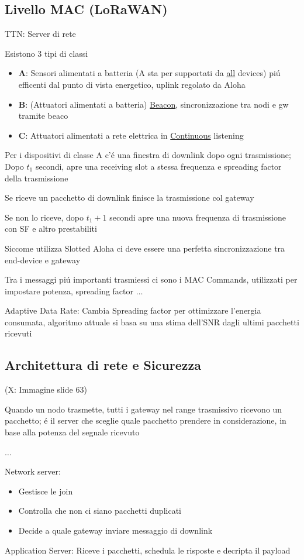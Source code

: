 \documentclass{article}
\begin{document}
\subsection{Livello MAC (LoRaWAN)}
TTN: Server di rete

Esistono 3 tipi di classi
\begin{itemize}
    \item \textbf{A}: Sensori alimentati a batteria (A sta per supportati da \underline{all} devices) pi\'u efficenti dal punto di vista energetico, uplink regolato da Aloha
    \item \textbf{B}: (Attuatori alimentati a batteria) \underline{Beacon}, sincronizzazione tra nodi e gw tramite beaco
    \item \textbf{C}: Attuatori alimentati a rete elettrica in \underline{Continuous} listening
\end{itemize}

Per i dispositivi di classe A c'\'e una finestra di downlink dopo ogni trasmissione; Dopo $t_1$ secondi, apre una receiving slot a stessa frequenza e spreading factor della trasmissione

Se riceve un pacchetto di downlink finisce la trasmissione col gateway

Se non lo riceve, dopo $t_1 + 1$ secondi apre una nuova frequenza di trasmissione con SF e altro prestabiliti

Siccome utilizza Slotted Aloha ci deve essere una perfetta sincronizzazione tra end-device e gateway

Tra i messaggi pi\'u importanti trasmiessi ci sono i MAC Commands, utilizzati per impostare potenza, spreading factor $\ldots$


Adaptive Data Rate: Cambia Spreading factor per ottimizzare l'energia consumata, algoritmo attuale si basa su una stima dell'SNR dagli ultimi pacchetti ricevuti

\subsection{Architettura di rete e Sicurezza}
\begin{center}
(X: Immagine slide 63)
\end{center}

Quando un nodo trasmette, tutti i gateway nel range trasmissivo ricevono un pacchetto; \'e il server che sceglie quale pacchetto prendere in considerazione, in base alla potenza del segnale ricevuto

$\ldots$

Network server:
\begin{itemize}
    \item Gestisce le join
    \item Controlla che non ci siano pacchetti duplicati
    \item Decide a quale gateway inviare messaggio di downlink
\end{itemize}

Application Server: Riceve i pacchetti, schedula le risposte e decripta il payload
\end{document}
